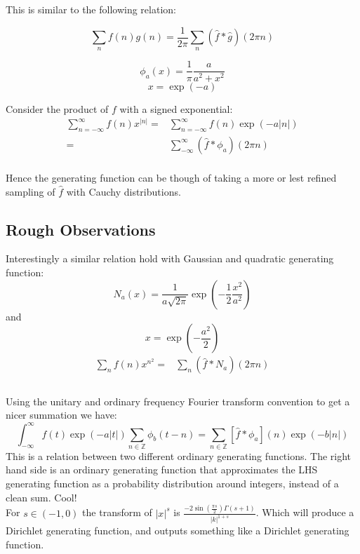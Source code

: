 This is similar to the following relation:

\[\sum_n f(n)g(n) = \frac{1}{2\pi}\sum_n (\hat{f} \ast \hat{g})(2\pi n)\]

\[\phi_a(x) = \frac{1}{\pi}\frac{a}{a^2+x^2}\]
\[x = \exp(-a) \]

Consider the product of $f$ with a signed exponential:
\begin{equation*}
\begin{aligned}
	\sum_{n = -\infty}^{\infty} f(n)x^{|n|} =& \sum_{n = -\infty}^{\infty} f(n)\exp(-a|n|) \\
	= & \sum_{-\infty}^{\infty} (\hat{f}\ast\phi_a)(2\pi n) \\
\end{aligned}
\end{equation*}

Hence the generating function can be though of taking a more or lest refined sampling of $\hat{f}$ with Cauchy distributions. 

\subsection{Rough Observations}
Interestingly a similar relation hold with Gaussian and quadratic generating function:
\[N_a(x) = \frac{1}{a\sqrt{2\pi}}\exp\left(-\frac{1}{2}\frac{x^2}{a^2}\right)\]
and
\[x = \exp\left(-\frac{a^2}{2}\right)\]
\begin{equation*}
\begin{aligned}
	\sum_n f(n) x^{n^2} =& \sum_n (\hat{f} \ast N_a)(2\pi n) \\
\end{aligned}
\end{equation*}
\\

Using the unitary and ordinary frequency Fourier transform convention to get a nicer summation we have:
\[\int_{-\infty}^{\infty}f(t)\exp(-a|t|)\sum_{n\in\mathbb{Z}}\phi_b(t-n) = \sum_{n\in\mathbb{Z}}[\hat{f}\ast\phi_a](n)\exp(-b|n|)\]
This is a relation between two different ordinary generating functions.
The right hand side is an ordinary generating function that approximates the LHS generating function as a probability distribution around integers, instead of a clean sum. Cool!
\\

For $s \in (-1,0)$ the transform of $|x|^s$  is $\frac{-2\sin(\frac{\pi s}{2})\Gamma(s+1)}{|k|^{1+s}}$.
Which will produce a Dirichlet generating function, and outputs something like a Dirichlet generating function.
\\


